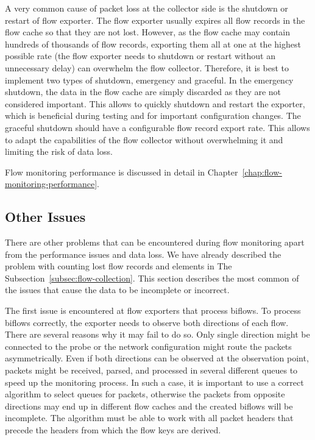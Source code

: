 A very common cause of packet loss at the collector side is the shutdown or restart of flow exporter. The flow exporter usually expires all flow records in the flow cache so that they are not lost. However, as the flow cache may contain hundreds of thousands of flow records, exporting them all at one at the highest possible rate (the flow exporter needs to shutdown or restart without an unnecessary delay) can overwhelm the flow collector. Therefore, it is best to implement two types of shutdown, emergency and graceful. In the emergency shutdown, the data in the flow cache are simply discarded as they are not considered important. This allows to quickly shutdown and restart the exporter, which is beneficial during testing and for important configuration changes. The graceful shutdown should have a configurable flow record export rate. This allows to adapt the capabilities of the flow collector without overwhelming it and limiting the risk of data loss.

Flow monitoring performance is discussed in detail in Chapter~\ref{chap:flow-monitoring-performance}.


\subsection{Other Issues}

There are other problems that can be encountered during flow monitoring apart from the performance issues and data loss. We have already described the problem with counting lost flow records and elements in The Subsection~\ref{subsec:flow-collection}. This section describes the most common of the issues that cause the data to be incomplete or incorrect.

The first issue is encountered at flow exporters that process biflows. To process biflows correctly, the exporter needs to observe both directions of each flow. There are several reasons why it may fail to do so. Only single direction might be connected to the probe or the network configuration might route the packets asymmetrically. Even if both directions can be observed at the observation point, packets might be received, parsed, and processed in several different queues to speed up the monitoring process. In such a case, it is important to use a correct algorithm to select queues for packets, otherwise the packets from opposite directions may end up in different flow caches and the created biflows will be incomplete. The algorithm must be able to work with all packet headers that precede the headers from which the flow keys are derived. 

